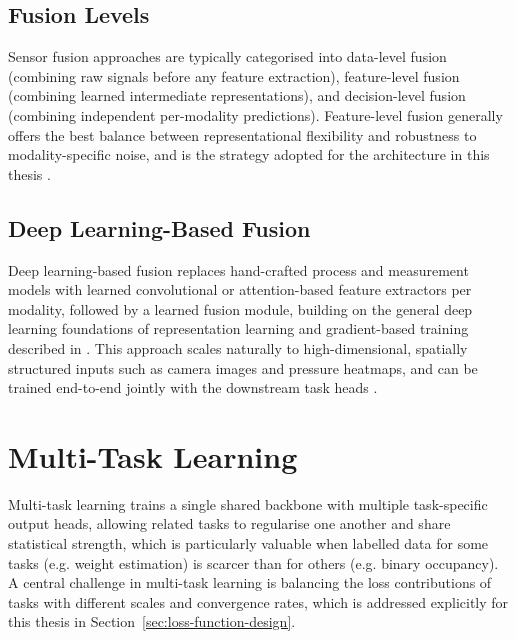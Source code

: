 \subsection{Fusion Levels}
\label{sec:fusion-levels}
Sensor fusion approaches are typically categorised into data-level fusion
(combining raw signals before any feature extraction), feature-level
fusion (combining learned intermediate representations), and
decision-level fusion (combining independent per-modality predictions).
Feature-level fusion generally offers the best balance between
representational flexibility and robustness to modality-specific noise,
and is the strategy adopted for the architecture in this thesis
\cite{chen2020multimodal}.





\subsection{Deep Learning-Based Fusion}
\label{sec:deep-learning-fusion}
Deep learning-based fusion replaces hand-crafted process and measurement
models with learned convolutional or attention-based feature extractors
per modality, followed by a learned fusion module, building on the
general deep learning foundations of representation learning and
gradient-based training described in \cite{goodfellow2016deep}. This
approach scales naturally to high-dimensional, spatially structured
inputs such as camera images and pressure heatmaps, and can be trained
end-to-end jointly with the downstream task heads
\cite{oliveira2022crossmodal}.

\section{Multi-Task Learning}
\label{sec:multi-task-learning}
Multi-task learning trains a single shared backbone with multiple
task-specific output heads, allowing related tasks to regularise one
another and share statistical strength, which is particularly valuable
when labelled data for some tasks (e.g. weight estimation) is scarcer than
for others (e.g. binary occupancy). A central challenge in multi-task
learning is balancing the loss contributions of tasks with different
scales and convergence rates, which is addressed explicitly for this
thesis in Section~\ref{sec:loss-function-design}.

